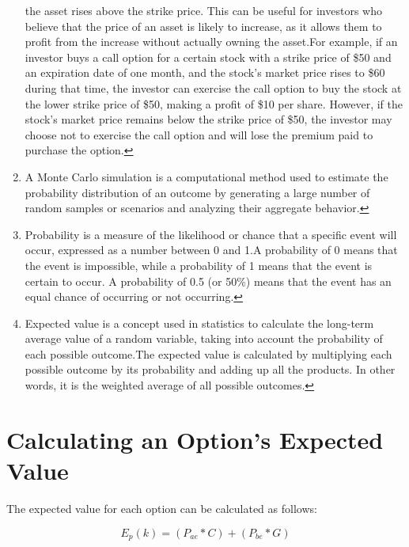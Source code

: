 \documentclass[
]{book}
\begin{document}
\begin{enumerate}
  the asset rises above the strike price. This can be useful for investors who
  believe that the price of an asset is likely to increase, as it allows them to
  profit from the increase without actually owning the asset.For example,
  if an investor buys a call option for a certain stock with a strike price of
  \$50 and an expiration date of one month, and the stock's market price rises to
  \$60 during that time, the investor can exercise the call option to buy the
  stock at the lower strike price of \$50, making a profit of \$10 per share.
  However, if the stock's market price remains below the strike price of \$50,
  the investor may choose not to exercise the call option and will lose the
  premium paid to purchase the option.\protect\hyperlink{intro}{↩︎}
\item
  A Monte Carlo simulation is a computational method used to estimate the
  probability distribution of an outcome by generating a large number of random
  samples or scenarios and analyzing their aggregate behavior.\protect\hyperlink{intro}{↩︎}
\item
  Probability is a measure of the likelihood or chance that a specific event
  will occur, expressed as a number between 0 and 1.A probability of 0
  means that the event is impossible, while a probability of 1 means that the
  event is certain to occur. A probability of 0.5 (or 50\%) means that the event
  has an equal chance of occurring or not occurring.\protect\hyperlink{intro}{↩︎}
\item
  Expected value is a concept used in statistics to calculate the long-term
  average value of a random variable, taking into account the probability of each
  possible outcome.The expected value is calculated by multiplying each
  possible outcome by its probability and adding up all the products. In other
  words, it is the weighted average of all possible outcomes.\protect\hyperlink{intro}{↩︎}
\end{enumerate}

\hypertarget{calculating-an-options-expected-value}{%
\chapter{Calculating an Option's Expected Value}\label{calculating-an-options-expected-value}}

The expected value for each option can be calculated as follows:

\begin{equation} 
E_p(k) = (P_{ae} * C) + (P_{be} * G)
\label{eq:puts}
\end{equation}
\end{document}
